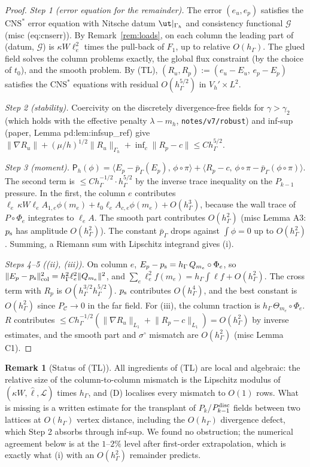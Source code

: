 \documentclass[11pt,reqno]{amsart}
\theoremstyle{plain}
\theoremstyle{definition}
\newtheorem{remark}[theorem]{Remark}
\newcommand{\hG}{h_\Gamma}
\newcommand{\Gh}{\Gamma_h}
\newcommand{\ip}[2]{\langle #1,\, #2\rangle}
\newcommand{\norm}[1]{\lVert #1\rVert}
\newcommand{\CNS}{\mathrm{CNS}^\ast}
\newcommand{\Pm}{\mathsf P_h}
\newcommand{\pbG}{\bar p_{\Gamma}}
\newcommand{\Lc}{\mathcal L}
\newcommand{\Cc}{\mathcal C}
\begin{document}
\begin{proof}
\emph{Step 1 (error equation for the remainder).} The error $(e_u,e_p)$ satisfies the $\CNS$ error equation with Nitsche datum $\ut|_{\Gh}$ and consistency functional $\mathcal G$ (misc (eq:cnserr)). By Remark~\ref{rem:loads}, on each column the leading part of (datum, $\mathcal G$) is $\kappa W\ell_e^2$ times the pull-back of $F_1$, up to relative $O(\hG)$. The glued field solves the column problems exactly, the global flux constraint (by the choice of $t_0$), and the smooth problem. By (TL), $(R_u,R_p):=(e_u-E_u,\,e_p-E_p)$ satisfies the $\CNS$ equations with residual $O(\hG^{5/2})$ in $V_h'\times L^2$.

\emph{Step 2 (stability).} Coercivity on the discretely divergence-free fields for $\gamma>\gamma_2$ (which holds with the effective penalty $\lambda-m_h$, \texttt{notes/v7/robust}) and inf-sup (paper, Lemma pd:lem:infsup\_ref) give $\norm{\nabla R_u}+(\mu/h)^{1/2}\norm{R_u}_{\Gh}+\inf_c\norm{R_p-c}\le C\hG^{5/2}$.

\emph{Step 3 (moment).} $\Pm(\phi)=\ip{E_p-\pbG(E_p)}{\phi\circ\pi}+\ip{R_p-c}{\phi\circ\pi-\pbG(\phi\circ\pi)}$. The second term is $\le C\hG^{-1/2}\cdot\hG^{5/2}$ by the inverse trace inequality on the $P_{k-1}$ pressure. In the first, the column $e$ contributes $\ell_e\,\kappa W\ell_eA_{1,e}\phi(m_e)+t_0\ell_eA_{c,e}\phi(m_e)+O(\hG^3)$, because the wall trace of $P\circ\Phi_e$ integrates to $\ell_eA$. The smooth part contributes $O(\hG^2)$ (misc Lemma A3: $p_{\rm s}$ has amplitude $O(\hG^2)$). The constant $\pbG$ drops against $\int\phi=0$ up to $O(\hG^2)$. Summing, a Riemann sum with Lipschitz integrand gives (i).

\emph{Steps 4--5 ((ii), (iii)).} On column $e$, $E_p-p_{\rm s}=\hG\,Q_{m_e}\circ\Phi_e$, so $\norm{E_p-p_{\rm s}}^2_{\text{col}}=\hG^2\ell_e^2\norm{Q_{m_e}}^2$, and $\sum_e\ell_e^2f(m_e)=\hG\int\hat\ell f+O(\hG^2)$. The cross term with $R_p$ is $O(\hG^{3/2}\hG^{5/2})$. $p_{\rm s}$ contributes $O(\hG^4)$, and the best constant is $O(\hG^2)$ since $P_\Cc\to0$ in the far field. For (iii), the column traction is $\hG\,\Theta_{m_e}\circ\Phi_e$. $R$ contributes $\le C\hG^{-1/2}(\norm{\nabla R_u}_{L_1}+\norm{R_p-c}_{L_1})=O(\hG^2)$ by inverse estimates, and the smooth part and $\sigma^\circ$ mismatch are $O(\hG^2)$ (misc Lemma C1).
\end{proof}

\begin{remark}[Status of (TL)]
All ingredients of (TL) are local and algebraic: the relative size of the column-to-column mismatch is the Lipschitz modulus of $(\kappa W,\hat\ell,\Lc)$ times $\hG$, and (D) localises every mismatch to $O(1)$ rows. What is missing is a written estimate for the transplant of $P_k$/$P_{k-1}^{\rm disc}$ fields between two lattices at $O(\hG)$ vertex distance, including the $O(\hG)$ divergence defect, which Step 2 absorbs through inf-sup. We found no obstruction; the numerical agreement below is at the $1$--$2\%$ level after first-order extrapolation, which is exactly what (i) with an $O(\hG^2)$ remainder predicts.
\end{remark}
\end{document}
